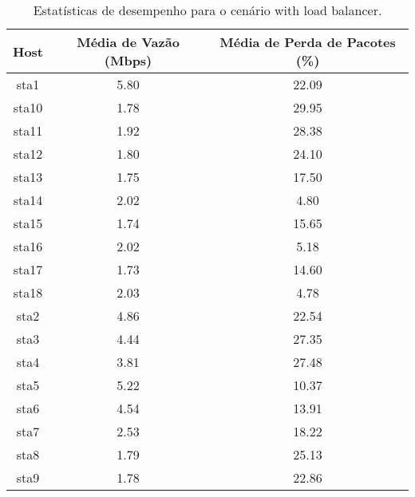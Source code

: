 \begin{table}[htbp]
    \centering
    \label{tab:with_load_balancer_stats}
    \begin{tabular}{|c|c|c|}
        \hline
        \textbf{Host} & \textbf{Média de Vazão (Mbps)} & \textbf{Média de Perda de Pacotes (\%)} \\ \hline
        sta1 & 5.80 & 22.09 \\ \hline
        sta10 & 1.78 & 29.95 \\ \hline
        sta11 & 1.92 & 28.38 \\ \hline
        sta12 & 1.80 & 24.10 \\ \hline
        sta13 & 1.75 & 17.50 \\ \hline
        sta14 & 2.02 & 4.80 \\ \hline
        sta15 & 1.74 & 15.65 \\ \hline
        sta16 & 2.02 & 5.18 \\ \hline
        sta17 & 1.73 & 14.60 \\ \hline
        sta18 & 2.03 & 4.78 \\ \hline
        sta2 & 4.86 & 22.54 \\ \hline
        sta3 & 4.44 & 27.35 \\ \hline
        sta4 & 3.81 & 27.48 \\ \hline
        sta5 & 5.22 & 10.37 \\ \hline
        sta6 & 4.54 & 13.91 \\ \hline
        sta7 & 2.53 & 18.22 \\ \hline
        sta8 & 1.79 & 25.13 \\ \hline
        sta9 & 1.78 & 22.86 \\ \hline
    \end{tabular}
    \caption{Estatísticas de desempenho para o cenário with load balancer.}
\end{table}


